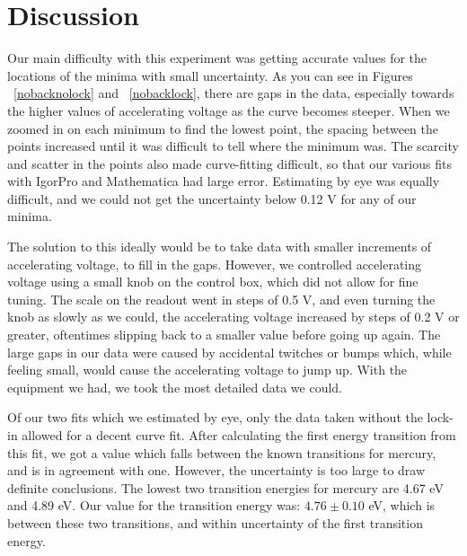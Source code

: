 \documentclass[prb,preprint]{revtex4-1}
\begin{document}
\section{Discussion}
Our main difficulty with this experiment was getting accurate values for the locations of the minima with small uncertainty.  As you can see in Figures ~\ref{nobacknolock} and ~\ref{nobacklock}, there are gaps in the data, especially towards the higher values of accelerating voltage as the curve becomes steeper.  When we zoomed in on each minimum to find the lowest point, the spacing between the points increased until it was difficult to tell where the minimum was.  The scarcity and scatter in the points also made curve-fitting difficult, so that our various fits with IgorPro and Mathematica had large error. Estimating by eye was equally difficult, and we could not get the uncertainty below 0.12 V for any of our minima.  

The solution to this ideally would be to take data with smaller increments of accelerating voltage, to fill in the gaps. However, we controlled accelerating voltage using a small knob on the control box, which did not allow for fine tuning. The scale on the readout went in steps of 0.5 V, and even turning the knob as slowly as we could, the accelerating voltage increased by steps of 0.2 V or greater, oftentimes slipping back to a smaller value before going up again. The large gaps in our data were caused by accidental twitches or bumps which, while feeling small, would cause the accelerating voltage to jump up. With the equipment we had,  we took the most detailed data we could. 

Of our two fits which we estimated by eye, only the data taken without the lock-in allowed for a decent curve fit.  After calculating the first energy transition from this fit, we got a value which falls between the known transitions for mercury, and is in agreement with one.  However, the uncertainty is too large to draw definite conclusions.  The lowest two transition energies for mercury are 4.67 eV and 4.89 eV.  Our value for the transition energy was: $4.76 \pm 0.10$ eV, which is between these two transitions, and within uncertainty of the first transition energy. 
\end{document}
